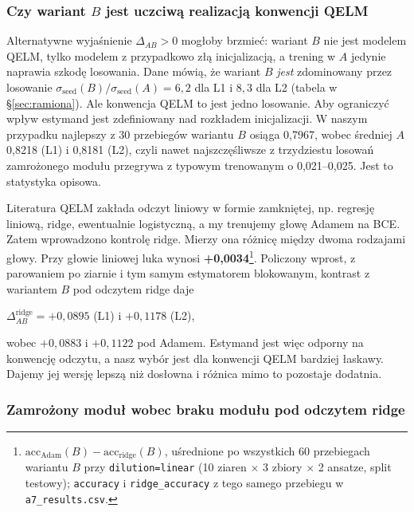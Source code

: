 \documentclass[11pt, a4paper]{article}
\begin{document}
\subsubsection{Czy wariant $B$ jest uczciwą realizacją konwencji QELM}

Alternatywne wyjaśnienie $\Delta_{AB} > 0$ mogłoby brzmieć: wariant $B$ nie jest modelem QELM, tylko modelem z przypadkowo złą inicjalizacją, a trening w $A$ jedynie naprawia szkodę losowania. Dane mówią, że wariant $B$ \emph{jest} zdominowany przez losowanie $\sigma_{\text{seed}}(B)/\sigma_{\text{seed}}(A) = 6{,}2$ dla L1 i $8{,}3$ dla L2 (tabela w \S\ref{sec:ramiona}). Ale konwencja QELM to jest jedno losowanie. Aby ograniczyć wpływ estymand jest zdefiniowany nad rozkładem inicjalizacji. W naszym przypadku najlepszy z 30 przebiegów wariantu $B$ osiąga 0,7967, wobec średniej $A$ 0,8218 (L1) i 0,8181 (L2), czyli nawet najszczęśliwsze z trzydziestu losowań zamrożonego modułu przegrywa z typowym trenowanym o 0,021--0,025. Jest to statystyka opisowa.

Literatura QELM zakłada odczyt liniowy w formie zamkniętej, np. regresję liniową, ridge, ewentualnie logistyczną, a my trenujemy głowę Adamem na BCE. Zatem wprowadzono kontrolę ridge. Mierzy ona różnicę między dwoma rodzajami głowy. Przy głowie liniowej luka wynosi \textbf{+0,0034}\footnote{$\text{acc}_{\text{Adam}}(B) - \text{acc}_{\text{ridge}}(B)$, uśrednione po wszystkich 60 przebiegach wariantu $B$ przy \texttt{dilution=linear} (10 ziaren $\times$ 3 zbiory $\times$ 2 ansatze, split testowy); \texttt{accuracy} i \texttt{ridge\_accuracy} z tego samego przebiegu w \texttt{a7\_results.csv}.}. Policzony wprost, z parowaniem po ziarnie i tym samym estymatorem blokowanym, kontrast z wariantem $B$ pod odczytem ridge daje

\begin{center}
$\Delta_{AB}^{\text{ridge}} = +0{,}0895$ (L1) \quad i \quad $+0{,}1178$ (L2),
\end{center}

wobec $+0{,}0883$ i $+0{,}1122$ pod Adamem. Estymand jest więc odporny na konwencję odczytu, a nasz wybór jest dla konwencji QELM bardziej łaskawy. Dajemy jej wersję lepszą niż dosłowna i różnica mimo to pozostaje dodatnia.
\subsubsection{Zamrożony moduł wobec braku modułu pod odczytem ridge}\label{sec:be-ridge}
\end{document}
